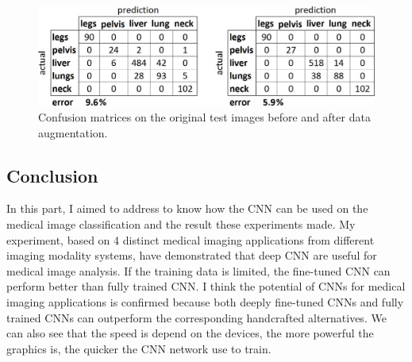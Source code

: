 \documentclass[10pt,twocolumn,letterpaper]{article}
\begin{document}
\begin{figure}[t]
	\begin{center}
		\includegraphics[width=0.8\linewidth]{1}
	\end{center}
	\caption{Confusion matrices on the original test images before and after data augmentation.} \label{fig:long}
	\label{fig:onecol}
\end{figure}

\subsection{Conclusion}

In this part, I aimed to address to know how the CNN can be used on the medical image classification and the result these experiments made. My experiment, based on 4 distinct medical imaging applications from different imaging modality systems, have demonstrated that deep CNN are useful for medical image analysis. If the training data is limited, the fine-tuned CNN can perform better than fully trained CNN. I think the potential of CNNs for medical imaging applications is confirmed because both deeply fine-tuned CNNs and fully trained CNNs can outperform the corresponding handcrafted alternatives. We can also see that the speed is depend on the devices, the more powerful the graphics is, the quicker the CNN network use to train.



{\small


}
\end{document}
